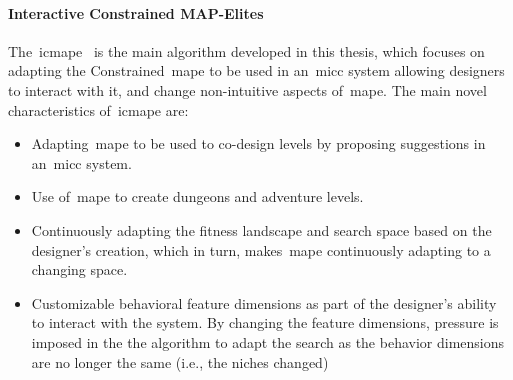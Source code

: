 


\paragraph{Interactive Constrained MAP-Elites}


The~\acrfull{icmape}~\cite{alvarez2019empowering,Alvarez2020-ICMAPE} is the main algorithm developed in this thesis, which focuses on adapting the Constrained~\acrshort{mape} to be used in an~\acrshort{micc} system allowing designers to interact with it, and change non-intuitive aspects of~\acrshort{mape}. The main novel characteristics of~\acrshort{icmape} are:

\begin{itemize}
    \item Adapting~\acrshort{mape} to be used to co-design levels by proposing suggestions in an~\acrshort{micc} system.
    \item Use of~\acrshort{mape} to create dungeons and adventure levels.
    \item Continuously adapting the fitness landscape and search space based on the designer's creation, which in turn, makes~\acrshort{mape} continuously adapting to a changing space.
    \item Customizable behavioral feature dimensions as part of the designer's ability to interact with the system. By changing the feature dimensions, pressure is imposed in the the algorithm to adapt the search as the behavior dimensions are no longer the same (i.e., the niches changed)
\end{itemize}

